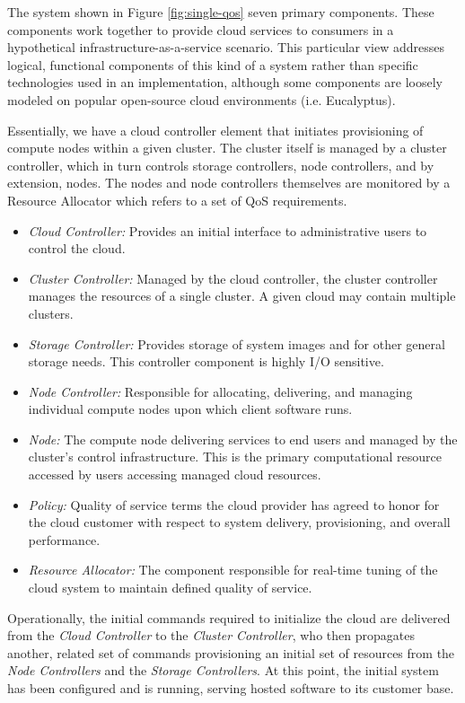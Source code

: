 \documentclass[times, 10pt,twocolumn]{article}
\begin{document}
The system shown in Figure \ref{fig:single-qos} seven primary components.  These components work together to provide cloud services to consumers in a hypothetical infrastructure-as-a-service scenario.  This particular view addresses logical, functional components of this kind of a system rather than specific technologies used in an implementation, although some components are loosely modeled on popular open-source cloud environments (i.e. Eucalyptus).

Essentially, we have a cloud controller element that initiates provisioning of compute nodes within a given cluster. The cluster itself is managed by a cluster controller, which in turn controls storage controllers, node controllers, and by extension, nodes.  The nodes and node controllers themselves are monitored by a Resource Allocator which refers to a set of QoS requirements.

\begin{itemize}
\item \textit{Cloud Controller:} Provides an initial interface to administrative users to control the cloud.
\item \textit{Cluster Controller:} Managed by the cloud controller, the cluster controller manages the resources of a single cluster. A given cloud may contain multiple clusters.
\item \textit{Storage Controller:} Provides storage of system images and for other general storage needs.  This controller component is highly I/O sensitive.
\item \textit{Node Controller:} Responsible for allocating, delivering, and managing individual compute nodes upon which client software runs.
\item \textit{Node:} The compute node delivering services to end users and managed by the cluster's control infrastructure.  This is the primary computational resource accessed by users accessing managed cloud resources.
\item \textit{Policy:} Quality of service terms the cloud provider has agreed to honor for the cloud customer with respect to system delivery, provisioning, and overall performance.
\item \textit{Resource Allocator:} The component responsible for real-time tuning of the cloud system to maintain defined quality of service.
\end{itemize}

Operationally, the initial commands required to initialize the cloud are delivered from the \textit{Cloud Controller} to the \textit{Cluster Controller}, who then propagates another, related set of commands provisioning an initial set of resources from the \textit{Node Controllers} and the \textit{Storage Controllers}.  At this point, the initial system has been configured and is running, serving hosted software to its customer base.
\end{document}

